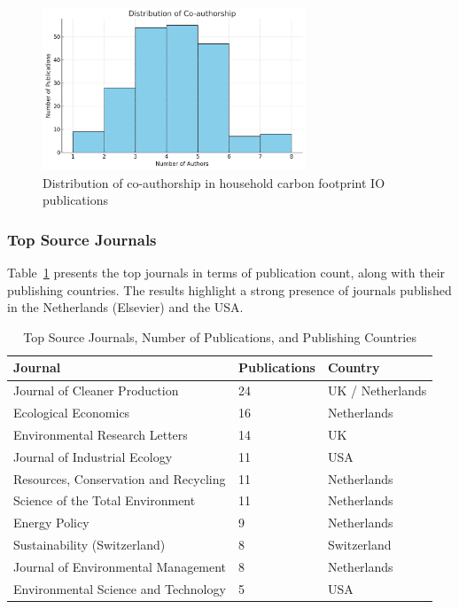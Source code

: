 \documentclass[12pt,a4paper]{article}%
\begin{document}
\begin{figure}[h]
\centering
\includegraphics[width=0.7\textwidth]{Coauthors.png}
\caption{Distribution of co-authorship in household carbon footprint IO publications}\label{fig:coauthorship}
\end{figure}

\subsubsection{Top Source Journals}

Table~\ref{tab:journal_countries} presents the top journals in terms of publication count, along with their publishing countries. The results highlight a strong presence of journals published in the Netherlands (Elsevier) and the USA.

\begin{table}[h]
\centering
\caption{Top Source Journals, Number of Publications, and Publishing Countries}\label{tab:journal_countries}
\begin{tabular}{lll}
\hline
\textbf{Journal} & \textbf{Publications} & \textbf{Country} \\
\hline
Journal of Cleaner Production & 24 & UK / Netherlands \\
Ecological Economics & 16 & Netherlands \\
Environmental Research Letters & 14 & UK \\
Journal of Industrial Ecology & 11 & USA \\
Resources, Conservation and Recycling & 11 & Netherlands \\
Science of the Total Environment & 11 & Netherlands \\
Energy Policy & 9 & Netherlands \\
Sustainability (Switzerland) & 8 & Switzerland \\
Journal of Environmental Management & 8 & Netherlands \\
Environmental Science and Technology & 5 & USA \\
\hline
\end{tabular}
\end{table}
\end{document}
